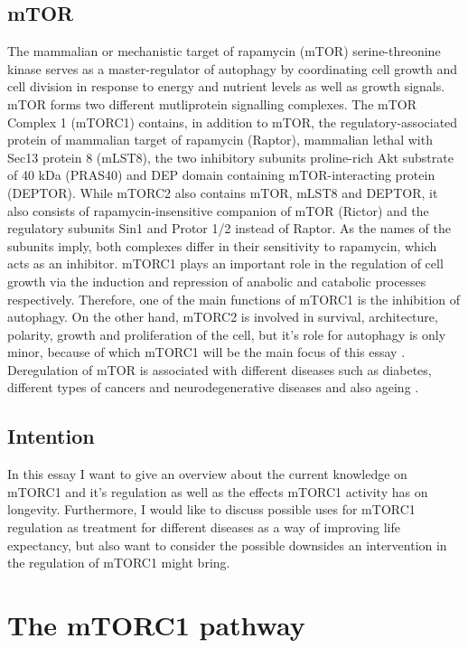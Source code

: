 \documentclass[12pt]{article} %
\begin{document}
\begin{linenumbers*}
\subsection{mTOR} The mammalian or mechanistic target of rapamycin (mTOR) serine-threonine kinase serves as a master-regulator of autophagy by coordinating cell growth and cell division in response to energy and nutrient levels as well as growth signals. 
mTOR forms two different mutliprotein signalling complexes. The mTOR Complex 1 (mTORC1) contains, in addition to mTOR, the regulatory-associated protein of mammalian target of rapamycin (Raptor), mammalian lethal with Sec13 protein 8 (mLST8), the two inhibitory subunits proline-rich Akt substrate of 40 kDa (PRAS40) and DEP domain containing mTOR-interacting protein (DEPTOR). While mTORC2 also contains mTOR, mLST8 and DEPTOR, it also consists of rapamycin-insensitive companion of mTOR (Rictor) and the regulatory subunits Sin1 and Protor 1/2 instead of Raptor. As the names of the subunits imply, both complexes differ in their sensitivity to rapamycin, which acts as an inhibitor. mTORC1 plays an important role in the regulation of cell growth via the induction and repression of anabolic and catabolic processes respectively. Therefore, one of the main functions of mTORC1 is the inhibition of autophagy. On the other hand, mTORC2 is involved in survival, architecture, polarity, growth and proliferation of the cell, but  it's role for autophagy is only minor, because of which mTORC1 will be the main focus of this essay
\citep{RabanalRuiz2018, Sciarretta2018}. Deregulation of mTOR is associated with different diseases such as diabetes, different types of cancers and neurodegenerative diseases and also ageing \citep{RabanalRuiz2018, Sciarretta2018}.

\subsection{Intention}

In this essay I want to give an overview about the current knowledge on mTORC1 and it's regulation as well as the effects mTORC1 activity has on longevity. Furthermore, I would like to discuss possible uses for mTORC1 regulation as treatment for different diseases as a way of improving life expectancy, but also want to consider the possible downsides an intervention in the regulation of mTORC1 might bring.

\section{The mTORC1 pathway}


\end{linenumbers*}
\end{document}
